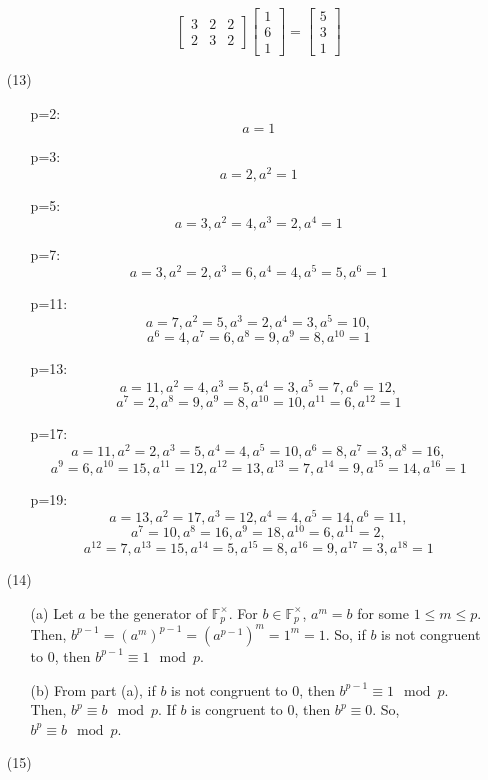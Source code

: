 \begin{itemize}
\begin{itemize}
$$\begin{bmatrix}
3 & 2 & 2 \\
2 & 3 & 2
\end{bmatrix}\begin{bmatrix}
1 \\
6 \\
1
\end{bmatrix} = \begin{bmatrix}
5 \\
3 \\
1
\end{bmatrix}$$
\end{itemize}
\item[(13)]
\begin{itemize}
\item[p=2:]
$$a = 1$$
\item[p=3:]
$$a = 2, a^2 = 1$$
\item[p=5:]
$$a = 3, a^2 = 4, a^3 = 2, a^4 = 1$$
\item[p=7:]
$$a = 3, a^2 = 2, a^3 = 6, a^4 = 4, a^5 = 5, a^6 = 1$$
\item[p=11:]
$$a = 7, a^2 = 5, a^3 = 2, a^4 = 3, a^5 = 10,$$
$$a^6 = 4, a^7 = 6, a^8 = 9, a^9 = 8, a^{10} = 1$$
\item[p=13:]
$$a = 11, a^2 = 4, a^3 = 5, a^4 = 3, a^5 = 7, a^6 = 12,$$
$$a^7 = 2, a^8 = 9, a^9 = 8, a^{10} = 10, a^{11} = 6, a^{12} = 1$$
\item[p=17:]
$$a = 11, a^2 = 2, a^3 = 5, a^4 = 4, a^5 = 10, a^6 = 8, a^7 = 3, a^8 = 16,$$
$$a^9 = 6, a^{10} = 15, a^{11} = 12, a^{12} = 13, a^{13} = 7, a^{14} = 9, a^{15} = 14, a^{16}= 1$$
\item[p=19:]
$$a = 13, a^2 = 17, a^3 = 12, a^4 = 4, a^5 = 14, a^6 = 11,$$
$$a^7 = 10, a^8 = 16, a^9 = 18, a^{10} = 6, a^{11} = 2,$$
$$a^{12} = 7, a^{13} = 15, a^{14} = 5, a^{15} = 8, a^{16} = 9, a^{17} = 3, a^{18} = 1$$
\end{itemize}
\item[(14)]
\begin{itemize}
\item[(a)]
Let $a$ be the generator of $\mathbb{F}_p^\times$. For $b \in \mathbb{F}_p^\times$, $a^m = b$ for some $1 \leq m \leq p$. Then, $b^{p - 1} = (a^m)^{p - 1} = (a^{p-1})^m = 1^m = 1$. So, if $b$ is not congruent to 0, then $b^{p - 1} \equiv 1 \mod p$.
\item[(b)]
From part (a), if $b$ is not congruent to 0, then $b^{p - 1} \equiv 1 \mod p$. Then, $b^p \equiv b \mod p$. If $b$ is congruent to 0, then $b^p \equiv 0$. So, $b^p \equiv b \mod p$.
\end{itemize}
\item[(15)]

\end{itemize}
